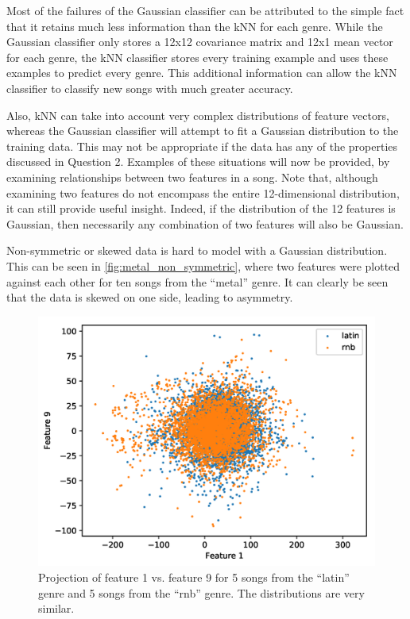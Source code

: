 \documentclass[a4paper,titlepage]{article}
\begin{document}
	Most of the failures of the Gaussian classifier can be attributed to the simple fact that it retains much less information than the kNN for each genre. While the Gaussian classifier only stores a 12x12 covariance matrix and 12x1 mean vector for each genre, the kNN classifier stores every training example and uses these examples to predict every genre. This additional information can allow the kNN classifier to classify new songs with much greater accuracy.
		

	Also, kNN can take into account very complex distributions of feature vectors, whereas the Gaussian classifier will attempt to fit a Gaussian distribution to the training data. This may not be appropriate if the data has any of the properties discussed in Question 2. Examples of these situations will now be provided, by examining relationships between two features in a song. Note that, although examining two features do not encompass the entire 12-dimensional distribution, it can still provide useful insight. Indeed, if the distribution of the 12 features is Gaussian, then necessarily any combination of two features will also be Gaussian.

	Non-symmetric or skewed data is hard to model with a Gaussian distribution. This can be seen in \autoref{fig:metal_non_symmetric}, where two features were plotted against each other for ten songs from the ``metal'' genre. It can clearly be seen that the data is skewed on one side, leading to asymmetry.
	
	
	
	\begin{figure}[!htb]
		\centering
		\includegraphics[width=\columnwidth]{plots/latin_rnb_similarity.png}
		\caption
		{Projection of feature 1 vs. feature 9 for 5 songs from the ``latin'' genre and 5 songs from the ``rnb'' genre. The distributions are very similar.}
		\label{fig:latin_rnb_similarity}
	\end{figure}
\end{document}
